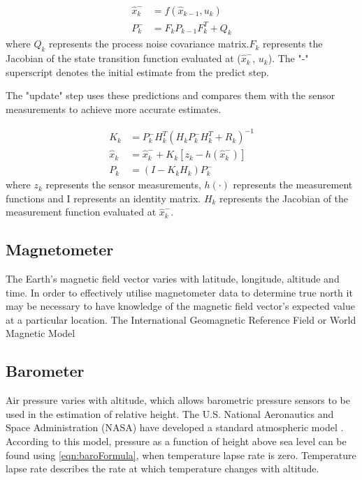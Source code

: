 \begin{equation}
\begin{split}
\hat{x}_{k}^{-}&=f(\hat{x}_{k-1}, u_{k})\\
P_{k}^{-}&=F_{k}P_{k-1}F_{k}^{T}+Q_{k}
\end{split}
\end{equation}
where $Q_{k}$ represents the process noise covariance matrix.$F_{k}$ represents the Jacobian of the state transition function evaluated at ($\hat{x}_{k}^{-}$, $u_{k}$).  The "-" superscript denotes the initial estimate from the predict step.


The "update" step uses these predictions and compares them with the sensor measurements to achieve more accurate estimates.

\begin{equation}
\begin{split}
K_{k}&=P_{k}^{-}H_{k}^{T}(H_{k}P_{k}^{-}H_{k}^{T}+R_{k})^{-1}\\
\hat{x}_{k}&=\hat{x}_{k}^{-}+K_{k}\left[z_{k}-h(\hat{x}_{k}^{-})\right]\\
P_{k}&=(I-K_{k}H_{k})P_{k}^{-}
\end{split}
\end{equation}
where $z_{k}$ represents the sensor measurements, $h(\cdot)$ represents the measurement functions and I represents an identity matrix. $H_{k}$ represents the Jacobian of the measurement function evaluated at $\hat{x}_{k}^{-}$.

\subsection{Magnetometer}
The Earth's magnetic field vector varies with latitude, longitude, altitude and time. In order to effectively utilise magnetometer data to determine true north it may be necessary to have knowledge of the magnetic field vector's expected value at a particular location. The International Geomagnetic Reference Field or World Magnetic Model

\subsection{Barometer}\label{section:barometerBackground}
Air pressure varies with altitude, which allows barometric pressure sensors to be used in the estimation of relative height. The U.S. National Aeronautics and Space Administration (NASA) have developed a standard atmospheric model \cite{Oceanic1976}. According to this model, pressure as a function of height above sea level can be found using \eqref{eqn:baroFormula}, when temperature lapse rate is zero. Temperature lapse rate describes the rate at which temperature changes with altitude. 

